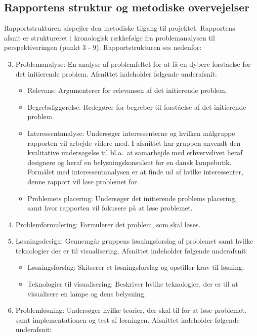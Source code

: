 \subsection{Rapportens struktur og metodiske overvejelser}
Rapportstrukturen afspejler den metodiske tilgang til projektet. Rapportens afsnit er struktureret i kronologisk rækkefølge fra problemanalysen til perspektiveringen (punkt 3 - 9). 
Rapportstrukturen ses nedenfor: 
\begin{enumerate}
\setcounter{enumi}{2}
\item Problemanalyse: En analyse af problemfeltet for at få en dybere forståelse for det initierende problem. Afsnittet indeholder følgende underafsnit:
  \begin{itemize}
    \item Relevans: Argumenterer for relevansen af det initierende problem.
    \item Begrebsliggørelse: Redegører for begreber til forståelse af det initierende problem.
    \item Interessentanalyse: Undersøger interessenterne og hvilken målgruppe rapporten vil arbejde videre med. I afsnittet har gruppen anvendt den kvalitative undersøgelse til bl.a.\ at samarbejde med erhvervslivet heraf designere og heraf en belysningskonsulent for en dansk lampebutik. Formålet med interessentanalysen er at finde ud af hvilke interessenter, denne rapport vil løse problemet for.
    \item Problemets placering: Undersøger det initierende problems placering, samt hvor rapporten vil fokusere på at løse problemet.
  \end{itemize}
\item Problemformulering: Formulerer det problem, som skal løses.
\item Løsningsdesign: Gennemgår gruppens løsningsforslag af problemet samt hvilke teknologier der er til visualisering. Afsnittet indeholder følgende underafsnit: 
  \begin{itemize}
    \item Løsningsforslag: Skitserer et løsningsforslag og opstiller krav til løsning.
    \item Teknologier til visualisering: Beskriver hvilke teknologier, der er til at visualisere en lampe og dens belysning.
  \end{itemize}
\item Problemløsning: Undersøger hvilke teorier, der skal til for at løse problemet, samt implementationen og test af løsningen. Afsnittet indeholder følgende underafsnit:

\end{enumerate}
